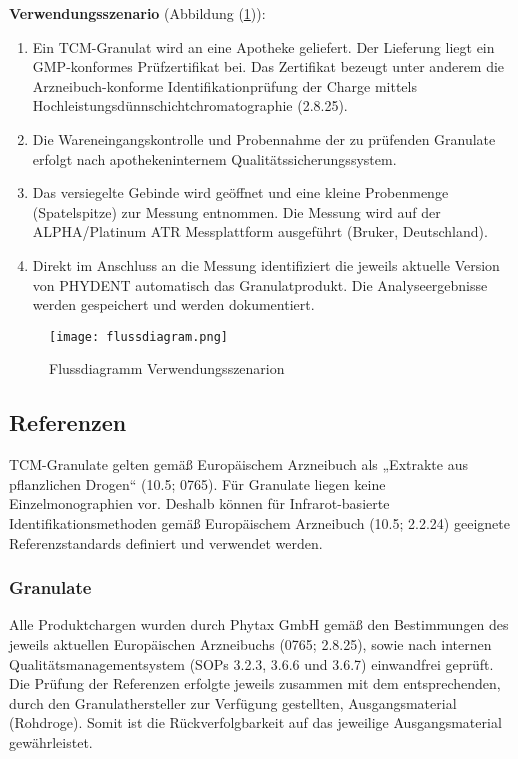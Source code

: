 \documentclass[11pt, a4paper]{article}
\newcommand\VersionPhEur{10.5}
\begin{document}
\textbf{Verwendungsszenario} (Abbildung (\ref{fig:Flussdiagram})):
\begin{enumerate}
\item Ein TCM-Granulat wird an eine Apotheke geliefert. Der Lieferung liegt ein GMP-konformes Prüfzertifikat bei. Das Zertifikat bezeugt unter anderem die Arzneibuch-konforme Identifikationprüfung der Charge mittels Hochleistungsdünnschichtchromatographie (2.8.25).
\item Die Wareneingangskontrolle und Probennahme der zu prüfenden Granulate erfolgt nach apothekeninternem Qualitätssicherungssystem.
\item Das versiegelte Gebinde wird geöffnet und eine kleine Probenmenge (Spatelspitze) zur Messung entnommen. Die Messung wird auf der ALPHA/Platinum ATR Messplattform ausgeführt (Bruker, Deutschland).
\item Direkt im Anschluss an die Messung identifiziert die jeweils aktuelle Version von PHYDENT automatisch das Granulatprodukt. Die Analyseergebnisse werden gespeichert und werden dokumentiert.
\end{enumerate}

\begin{figure}
\centering
\texttt{[image: flussdiagram.png]}
\caption{Flussdiagramm Verwendungsszenarion}
\label{fig:Flussdiagram}
\end{figure}

\subsection{Referenzen}
TCM-Granulate gelten gemäß Europäischem Arzneibuch als „Extrakte aus pflanzlichen Drogen“ (\VersionPhEur; 0765). Für Granulate liegen keine Einzelmonographien vor. Deshalb können für Infrarot-basierte Identifikationsmethoden gemäß Europäischem Arzneibuch (\VersionPhEur; 2.2.24) geeignete Referenzstandards definiert und verwendet werden.

\subsubsection{Granulate}
Alle Produktchargen wurden durch Phytax GmbH gemäß den Bestimmungen des jeweils aktuellen Europäischen Arzneibuchs (0765; 2.8.25), sowie nach internen Qualitätsmanagementsystem (SOPs 3.2.3, 3.6.6 und 3.6.7) einwandfrei geprüft. Die Prüfung der Referenzen erfolgte jeweils zusammen mit dem entsprechenden, durch den Granulathersteller zur Verfügung gestellten, Ausgangsmaterial (Rohdroge). Somit ist die Rückverfolgbarkeit auf das jeweilige Ausgangsmaterial gewährleistet.
\end{document}

